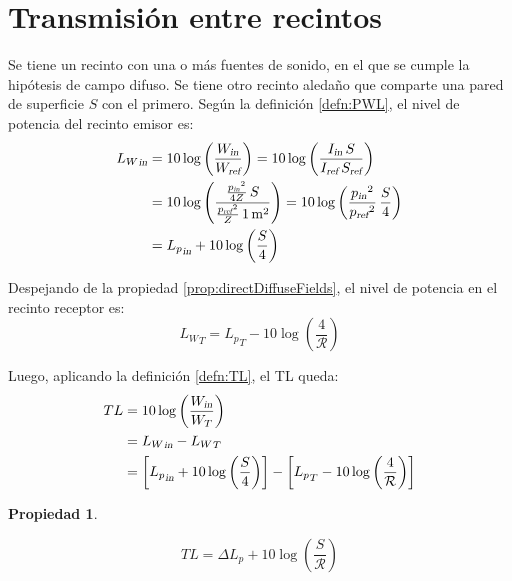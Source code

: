 \documentclass[a5paper,12pt,twoside]{book}
\newtheorem{prop}{{Propiedad}}[chapter]
\begin{document}
\section{Transmisión entre recintos}

Se tiene un recinto con una o más fuentes de sonido, en el que se cumple la hipótesis de campo difuso.
Se tiene otro recinto aledaño que comparte una pared de superficie $S$ con el primero.
Según la definición \ref{defn:PWL}, el nivel de potencia del recinto emisor es:
\begin{align*}
    {{L_W}_\textsl{{in}}}
    &= 10 \log \left( \frac{{{W}_\textsl{{in}}}}{{{W}_\textsl{{ref}}}} \right)
    = 10 \log \left( \frac{ {{I}_\textsl{{in}}} \, S }{ {{I}_\textsl{{ref}}} \, {{S}_\textsl{{ref}}} } \right)
    \\
    &= 10 \log \left( \frac{ \frac{{{p}_\textsl{{in}}}^2}{4Z} \, S }{ \frac{{{p}_\textsl{{ref}}}^2}{Z} \, 1\,\si{\metre^2} } \right)
    = 10 \log \left( \frac{{{p}_\textsl{{in}}}^2}{{{p}_\textsl{{ref}}}^2} \,  \frac{S}{4} \right)
    \\
    &= {{L_p}_\textsl{{in}}} + 10 \log \left( \frac{S}{4} \right)
\end{align*}

Despejando de la propiedad \ref{prop:directDiffuseFields}, el nivel de potencia en el recinto receptor es:
\begin{equation*}
    {L_W}_T = {L_p}_T - 10 \log \left( \frac{4}{\mathcal{R}} \right)
\end{equation*}

Luego, aplicando la definición \ref{defn:TL}, el TL queda:
\begin{align*}
    TL &=
    10 \log \left( \frac{{{W}_\textsl{{in}}}}{W_T} \right)
    \\
    &= {{L_W}_\textsl{{in}}} - {L_W}_T
    \\
    &= \left[ {{L_p}_\textsl{{in}}} + 10 \log \left( \frac{S}{4} \right) \right] - \left[ {L_p}_T - 10 \log \left( \frac{4}{\mathcal{R}} \right) \right]
\end{align*}

\begin{mdframed}[style=PropertyFrame]
    \begin{prop}
    \end{prop}
    \begin{equation*}
        TL = \Delta L_p + 10 \log \left( \frac{S}{\mathcal{R}} \right)
    \end{equation*}
\end{mdframed}
\end{document}

